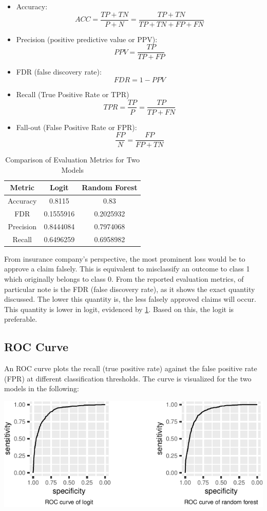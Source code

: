 \documentclass{article}
\providecommand{\tightlist}{%
  \setlength{\itemsep}{0pt}\setlength{\parskip}{0pt}}
\begin{document}
\begin{itemize}
\tightlist
\item
  Accuracy:
  \[ACC = \frac{TP + TN}{P + N} = \frac{TP + TN}{TP + TN + FP + FN}\]
\item
  Precision (positive predictive value or PPV):
  \[PPV = \frac{TP}{TP + FP}\]
\item
  FDR (false discovery rate): \[FDR = 1 - PPV\]
\item
  Recall (True Positive Rate or TPR)
  \[TPR = \frac{TP}{P} = \frac{TP}{TP + FN}\]
\item
  Fall-out (False Positive Rate or FPR):
  \[\frac{FP}{N} = \frac{FP}{FP + TN}\]
\end{itemize}

\begin{table}[h]
\centering
\begin{tabular}{|c|c|c|}
\hline
\textbf{Metric} & \textbf{Logit} & \textbf{Random Forest} \\
\hline
Accuracy & 0.8115 & 0.83 \\
FDR & 0.1555916 & 0.2025932 \\
Precision & 0.8444084 & 0.7974068 \\
Recall & 0.6496259 & 0.6958982 \\
\hline
\end{tabular}
\caption{Comparison of Evaluation Metrics for Two Models}
\label{tab:comparison}
\end{table}

From insurance company's perspective, the most prominent loss would be
to approve a claim falsely. This is equivalent to misclassify an outcome
to class 1 which originally belongs to class 0. From the reported
evaluation metrics, of particular note is the FDR (false discovery
rate), as it shows the exact quantity discussed. The lower this quantity
is, the less falsely approved claims will occur. This quantity is lower
in logit, evidenced by \ref{tab:comparison}. Based on this, the logit is
preferable.

\hypertarget{roc-curve}{%
\subsection{ROC Curve}\label{roc-curve}}

An ROC curve plots the recall (true positive rate) against the false
positive rate (FPR) at different classification thresholds. The curve is
visualized for the two models in the following:

\begin{center}\includegraphics{report_files/figure-latex/unnamed-chunk-20-1} \end{center}
\end{document}
